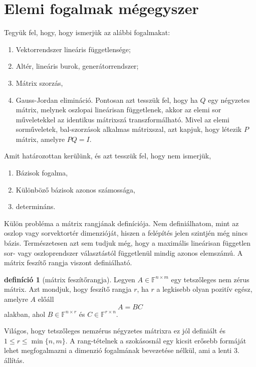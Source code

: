 \documentclass[9pt, showtrims]{memoir}
\theoremstyle{plain}
\theoremstyle{remark}
\theoremstyle{definition}
\newtheorem{definition}[proposition]{definíció}
\renewcommand{\mathbf}{\mathbb}
\begin{document}
\chapter*{Elemi fogalmak mégegyszer}
Tegyük fel, hogy, hogy ismerjük az alábbi fogalmakat:
\begin{enumerate}
    \item Vektorrendszer lineáris függetlensége;
    \item Altér, lineáris burok, generátorrendszer;
    \item Mátrix szorzás,
    \item Gauss-Jordan elimináció. Pontosan azt tesszük fel, hogy ha $Q$ egy négyzetes mátrix, melynek oszlopai
        lineárisan függetlenek, akkor az elemi sor műveletekkel az identikus mátrixszá transzformálható.
        Mivel az elemi sorműveletek, bal-szorzások alkalmas mátrixszal, 
        azt kapjuk, hogy létezik $P$ mátrix, amelyre $PQ=I$.
\end{enumerate}
Amit határozottan kerülünk, és azt tesszük fel, hogy nem ismerjük,
\begin{enumerate}
    \item Bázisok fogalma,
    \item Különböző bázisok azonos számossága,
    \item determináns.
\end{enumerate}
Külön probléma a mátrix rangjának definíciója.
Nem definiálhatom, 
mint az oszlop vagy sorvektortér dimenzióját, hiszen a felépítés jelen szintjén még nincs bázis.
Természetesen azt sem tudjuk még, hogy a maximális lineárisan független sor- vagy oszloprendszer választástól függetlenül mindig azonos elemszámú.
A mátrix feszítő rangja viszont definiálható.
\begin{definition}[mátrix feszítőrangja]
    Legyen $A\in\mathbf{F}^{n\times m}$ egy tetszőleges nem zérus mátrix.
    Azt mondjuk, hogy feszítő rangja $r$, ha $r$ a legkisebb olyan pozitív egész, amelyre $A$ előáll
    \[
        A=BC
    \]
    alakban, ahol $B\in\mathbf{F}^{n\times r}$ és $C\in\mathbb{F}^{r\times n}$.
\end{definition}
Világos, hogy tetszőleges nemzérus négyzetes mátrixra ez jól definiált és $1\leq r \leq \min\{n,m\}$.
A rang-tételnek a szokásosnál egy kicsit erősebb formáját lehet megfogalmazni a dimenzió fogalmának bevezetése nélkül,
ami a lenti 3. állítás.
\end{document}
